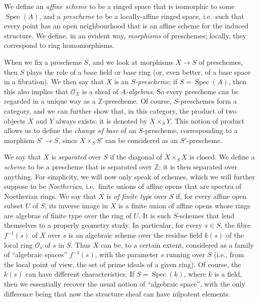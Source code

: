 \documentclass{article}
\newcommand{\oldpage}[1]{\marginpar{\footnotesize$\Big\vert$ \textit{p.~#1}}}
\theoremstyle{definition}
\theoremstyle{definition}
\theoremstyle{definition}
\theoremstyle{definition}
\theoremstyle{remark}
\begin{document}
\oldpage{182-02}We define an \emph{affine scheme} to be a ringed space that is isomorphic to some \(\operatorname{Spec}(A)\), and a \emph{prescheme} to be a locally-affine ringed space, i.e.~such that every point has an open neighbourhood that is an affine scheme for the induced structure.
We define, in an evident way, \emph{morphisms} of preschemes;
locally, they correspond to ring homomorphisms.

When we fix a prescheme \(S\), and we look at morphisms \(X\to S\) of preschemes, then \(S\) plays the role of a base field or base ring (or, even better, of a base space in a fibration).
We then say that \(X\) is an \emph{\(S\)-prescheme};
if \(S=\operatorname{Spec}(A)\), then this also implies that \({\mathscr{O}}_X\) is a sheaf of \emph{\(A\)-algebras}.
So every prescheme can be regarded in a unique way as a \(\mathbb{Z}\)-prescheme.
Of course, \(S\)-preschemes form a category, and we can further show that, in this category, the product of two objects \(X\) and \(Y\) always exists;
it is denoted by \(X\times_S Y\).
This notion of product allows us to define the \emph{change of base} of an \(S\)-prescheme, corresponding to a morphism \(S'\to S\), since \(X\times_S S'\) can be considered as an \(S'\)-prescheme.

We say that \(X\) is \emph{separated} over \(S\) if the diagonal of \(X\times_S X\) is closed.
We define a \emph{scheme} to be a prescheme that is separated over \(\mathbb{Z}\);
it is then separated over anything.
For simplicity, we will now only speak of schemes, which we will further suppose to be \emph{Noetherian}, i.e.~finite unions of affine opens that are spectra of Noetherian rings.
We say that \(X\) is \emph{of finite type} over \(S\) if, for every affine open subset \(U\) of \(S\), its inverse image in \(X\) is a finite union of affine opens whose rings are algebras of finite type over the ring of \(U\).
It is such \(S\)-schemes that lend themselves to a properly geometry study.
In particular, for every \(s\in S\), the fibre \(f^{-1}(s)\) of \(X\) over \(s\) is an algebraic scheme over the residue field \(k(s)\) of the local ring \({\mathscr{O}}_s\) of \(s\) in \(S\).
Thus \(X\) can be, to a certain extent, considered as a family of ``algebraic spaces'' \(f^{-1}(s)\), with the parameter \(s\) running over \(S\) (i.e., from the local point of view, the set of prime ideals of a given ring).
Of course, the \(k(s)\) can have different characteristics.
If \(S=\operatorname{Spec}(k)\), where \(k\) is a field, then we essentially recover the usual notion of ``algebraic space'', with the only difference being that now the structure sheaf can have nilpotent elements.
\end{document}
